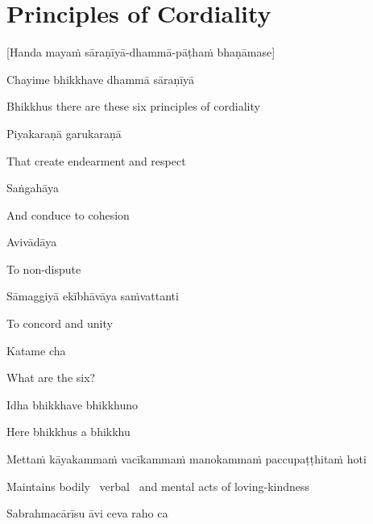 \section{Principles of Cordiality}
\label{principles-of-cordiality}

\begin{center}
  [Handa mayaṁ sāraṇīyā-dhammā-pāṭhaṁ bhaṇāmase]
\end{center}

Chayime bhikkhave dhammā sāraṇīyā

\begin{english}
  Bhikkhus there are these six principles of cordiality
\end{english}

Piyakaraṇā garukaraṇā

\begin{english}
  That create endearment and respect
\end{english}

Saṅgahāya

\begin{english}
  And conduce to cohesion
\end{english}

Avivādāya

\begin{english}
  To non-dispute
\end{english}

Sāmaggiyā ekībhāvāya saṁvattanti

\begin{english}
  To concord and unity
\end{english}

Katame cha

\begin{english}
  What are the six?
\end{english}

Idha bhikkhave bhikkhuno

\begin{english}
  Here bhikkhus a bhikkhu
\end{english}

Mettaṁ kāyakammaṁ vacīkammaṁ manokammaṁ paccupaṭṭhitaṁ hoti

\begin{english}
  Maintains bodily \breathmark\ verbal \breathmark\ and mental acts of loving-kindness
\end{english}

Sabrahmacārīsu āvi ceva raho ca

